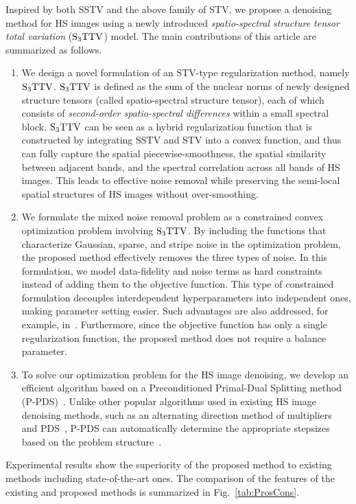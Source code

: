\documentclass[10pt,journal]{IEEEtran}
\begin{document}
Inspired by both SSTV and the above family of STV, we propose a denoising method for HS images using a newly introduced \textit{spatio-spectral structure tensor total variation} (${\text{S}_{3} \text{TTV}}$) model.
The main contributions of this article are summarized as follows.
\begin{enumerate}
    \item We design a novel formulation of an STV-type regularization method, namely ${\text{S}_{3} \text{TTV}}$.
    ${\text{S}_{3} \text{TTV}}$ is defined as the sum of the nuclear norms of newly designed structure tensors (called spatio-spectral structure tensor), each of which consists of \textit{second-order spatio-spectral differences} within a small spectral block.
    ${\text{S}_{3} \text{TTV}}$ can be seen as a hybrid regularization function that is constructed by integrating SSTV and STV into a convex function, and thus can fully capture the spatial piecewise-smoothness, the spatial similarity between adjacent bands, and the spectral correlation across all bands of HS images.
    This leads to effective noise removal while preserving the semi-local spatial structures of HS images without over-smoothing.

    \item We formulate the mixed noise removal problem as a constrained convex optimization problem involving ${\text{S}_{3} \text{TTV}}$.
    By including the functions that characterize Gaussian, sparse, and stripe noise in the optimization problem, the proposed method effectively removes the three types of noise.
    In this formulation, we model data-fidelity and noise terms as hard constraints instead of adding them to the objective function.
    This type of constrained formulation decouples interdependent hyperparameters into independent ones, making parameter setting easier.
    Such advantages are also addressed, for example, in~\cite{Constraint_Afonso2011,Constraint_Chierchia2015, Constraint_Ono2015, Constraint_Ono2017, Constraint_Ono2019, Naganuma2022Destriping}.
    Furthermore, since the objective function has only a single regularization function, the proposed method does not require a balance parameter.

    \item To solve our optimization problem for the HS image denoising, we develop an efficient algorithm based on a Preconditioned Primal-Dual Splitting method (P-PDS)~\cite{Pock2011PPDS}. 
    Unlike other popular algorithms used in existing HS image denoising methods, such as an alternating direction method of multipliers~\cite{Boyd2011ADMM} and PDS~\cite{Chambolle2011PDS, Condat2013PDS}, P-PDS can automatically determine the appropriate stepsizes based on the problem structure~\cite{Pock2011PPDS,Naganuma2023PPDS}. 
    
\end{enumerate}
Experimental results show the superiority of the proposed method to existing methods including state-of-the-art ones.
The comparison of the features of the existing and proposed methods is summarized in Fig.~\ref{tab:ProsCons}.
\end{document}
